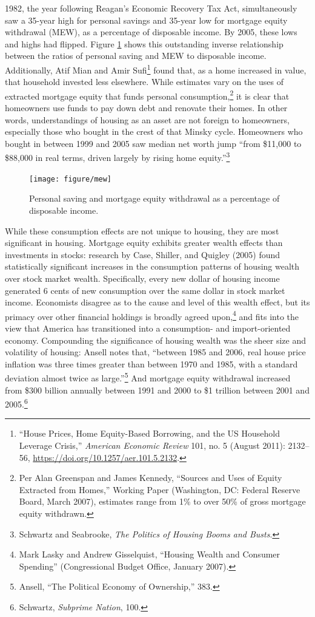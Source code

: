 \documentclass[12pt,oneside]{psthesis}
\begin{document}
1982, the year following Reagan's Economic Recovery Tax Act, simultaneously saw a 35-year high for personal savings and 35-year low for mortgage equity withdrawal (MEW), as a percentage of disposable income.
By 2005, these lows and highs had flipped.
Figure \ref{fig:mew} shows this outstanding inverse relationship between the ratios of personal saving and MEW to disposable income.
Additionally, Atif Mian and Amir Sufi\footnote{``House Prices, Home Equity-Based Borrowing, and the US Household Leverage Crisis,'' \emph{American Economic Review} 101, no. 5 (August 2011): 2132--56, \url{https://doi.org/10.1257/aer.101.5.2132}.} found that, as a home increased in value, that household invested less elsewhere.
While estimates vary on the uses of extracted mortgage equity that funds personal consumption,\footnote{Per Alan Greenspan and James Kennedy, ``Sources and Uses of Equity Extracted from Homes,'' Working Paper (Washington, DC: Federal Reserve Board, March 2007), estimates range from 1\% to over 50\% of gross mortgage equity withdrawn.} it is clear that homeowners use funds to pay down debt and renovate their homes.
In other words, understandings of housing as an asset are not foreign to homeowners, especially those who bought in the crest of that Minsky cycle.
Homeowners who bought in between 1999 and 2005 saw median net worth jump ``from \$11,000 to \$88,000 in real terms, driven largely by rising home equity.''\footnote{Schwartz and Seabrooke, \emph{The Politics of Housing Booms and Busts}.}
\begin{figure}

{\centering \texttt{[image: figure/mew]} 

}

\caption{Personal saving and mortgage equity withdrawal as a percentage of disposable income.}\label{fig:mew}
\end{figure}
While these consumption effects are not unique to housing, they are most significant in housing.
Mortgage equity exhibits greater wealth effects than investments in stocks: research by Case, Shiller, and Quigley (2005) found statistically significant increases in the consumption patterns of housing wealth over stock market wealth.
Specifically, every new dollar of housing income generated 6 cents of new consumption over the same dollar in stock market income.
Economists disagree as to the cause and level of this wealth effect, but its primacy over other financial holdings is broadly agreed upon,\footnote{Mark Lasky and Andrew Gisselquist, ``Housing Wealth and Consumer Spending'' (Congressional Budget Office, January 2007).} and fits into the view that America has transitioned into a consumption- and import-oriented economy.
Compounding the significance of housing wealth was the sheer size and volatility of housing: Ansell notes that, ``between 1985 and 2006, real house price inflation was three times greater than between 1970 and 1985, with a standard deviation almost twice as large.''\footnote{Ansell, ``The Political Economy of Ownership,'' 383.}
And mortgage equity withdrawal increased from \$300 billion annually between 1991 and 2000 to \$1 trillion between 2001 and 2005.\footnote{Schwartz, \emph{Subprime Nation}, 100.}
\end{document}

